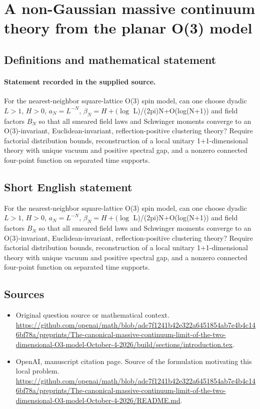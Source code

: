 \documentclass[11pt]{article}
\begin{document}
\section*{A non-Gaussian massive continuum theory from the planar O(3) model}\label{30007377}
\subsection{Definitions and mathematical statement}
\paragraph{Statement recorded in the supplied source.}
For the nearest-neighbor square-lattice O(3) spin model, can one choose dyadic $L>1$, $H>0$, $a_N=L^{-N}$, $\beta _N=H+(\log $ L)/(2pi)N+O(log(N+1)) and field factors $B_N$ so that all smeared field laws and Schwinger moments converge to an O(3)-invariant, Euclidean-invariant, reflection-positive clustering theory? Require factorial distribution bounds, reconstruction of a local unitary 1+1-dimensional theory with unique vacuum and positive spectral gap, and a nonzero connected four-point function on separated time supports.
\subsection{Short English statement}
For the nearest-neighbor square-lattice O(3) spin model, can one choose dyadic $L>1$, $H>0$, $a_N=L^{-N}$, $\beta _N=H+(\log $ L)/(2pi)N+O(log(N+1)) and field factors $B_N$ so that all smeared field laws and Schwinger moments converge to an O(3)-invariant, Euclidean-invariant, reflection-positive clustering theory? Require factorial distribution bounds, reconstruction of a local unitary 1+1-dimensional theory with unique vacuum and positive spectral gap, and a nonzero connected four-point function on separated time supports.
\subsection{Sources}
\begin{itemize}
\item[S1] Original question source or mathematical context.
\url{https://github.com/openai/math/blob/adc7f1241b42e322a6451854ab7e4b4c146bf78a/preprints/The-canonical-massive-continuum-limit-of-the-two-dimensional-O3-model-October-4-2026/build/sections/introduction.tex}.
\item[S2] OpenAI, manuscript citation page. Source of the formulation motivating this local problem.
\url{https://github.com/openai/math/blob/adc7f1241b42e322a6451854ab7e4b4c146bf78a/preprints/The-canonical-massive-continuum-limit-of-the-two-dimensional-O3-model-October-4-2026/README.md}.
\end{itemize}
\end{document}
